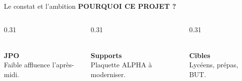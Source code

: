 \documentclass[10pt,aspectratio=169]{beamer}
\begin{document}
\begin{frame}[shrink=15]{Le constat et l'ambition}
    \textbf{\small\color{ensargray} POURQUOI CE PROJET ?}
    \vspace{0.1cm}

    \begin{columns}[T]
        \begin{column}{0.31\textwidth}
            \begin{card}
                \centering
                {\Large\color{ensarorange}}\\[0.05cm]
                \textbf{\footnotesize JPO}\\[0.02cm]
                {\scriptsize Faible affluence l'après-midi.}
            \end{card}
        \end{column}

        \begin{column}{0.31\textwidth}
            \begin{card}
                \centering
                {\Large\color{ensarorange}}\\[0.05cm]
                \textbf{\footnotesize Supports}\\[0.02cm]
                {\scriptsize Plaquette ALPHA à moderniser.}
            \end{card}
        \end{column}

        \begin{column}{0.31\textwidth}
            \begin{card}
                \centering
                {\Large\color{ensarorange}}\\[0.05cm]
                \textbf{\footnotesize Cibles}\\[0.02cm]
                {\scriptsize Lycéens, prépas, BUT.}
            \end{card}
        \end{column}
    \end{columns}

    \vspace{0.2cm}


\end{frame}
\end{document}
